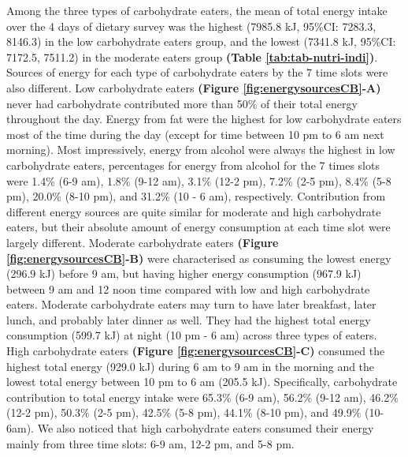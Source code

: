 Among the three types of carbohydrate eaters, the mean of total energy intake over the 4 days of dietary survey was the highest (7985.8 kJ, 95\%CI: 7283.3, 8146.3) in the low carbohydrate eaters group, and the lowest (7341.8 kJ, 95\%CI: 7172.5, 7511.2) in the moderate eaters group \textbf{(Table \ref{tab:tab-nutri-indi})}. Sources of energy for each type of carbohydrate eaters by the 7 time slots were also different. Low carbohydrate eaters \textbf{(Figure \ref{fig:energysourcesCB}-A)} never had carbohydrate contributed more than 50\% of their total energy throughout the day. Energy from fat were the highest for low carbohydrate eaters most of the time during the day (except for time between 10 pm to 6 am next morning). Most impressively, energy from alcohol were always the highest in low carbohydrate eaters, percentages for energy from alcohol for the 7 times slots were 1.4\% (6-9 am), 1.8\% (9-12 am), 3.1\% (12-2 pm), 7.2\% (2-5 pm), 8.4\% (5-8 pm), 20.0\% (8-10 pm), and 31.2\% (10 - 6 am), respectively. Contribution from different energy sources are quite similar for moderate and high carbohydrate eaters, but their absolute amount of energy consumption at each time slot were largely different. Moderate carbohydrate eaters \textbf{(Figure \ref{fig:energysourcesCB}-B)} were characterised as consuming the lowest energy (296.9 kJ) before 9 am, but having higher energy consumption (967.9 kJ) between 9 am and 12 noon time compared with low and high carbohydrate eaters. Moderate carbohydrate eaters may turn to have later breakfast, later lunch, and probably later dinner as well. They had the highest total energy consumption (599.7 kJ) at night (10 pm - 6 am) across three types of eaters. High carbohydrate eaters \textbf{(Figure \ref{fig:energysourcesCB}-C)} consumed the highest total energy (929.0 kJ) during 6 am to 9 am in the morning and the lowest total energy between 10 pm to 6 am (205.5 kJ). Specifically, carbohydrate contribution to total energy intake were 65.3\% (6-9 am), 56.2\% (9-12 am), 46.2\% (12-2 pm), 50.3\% (2-5 pm), 42.5\% (5-8 pm), 44.1\% (8-10 pm), and 49.9\% (10-6am). We also noticed that high carbohydrate eaters consumed their energy mainly from three time slots: 6-9 am, 12-2 pm, and 5-8 pm. 

